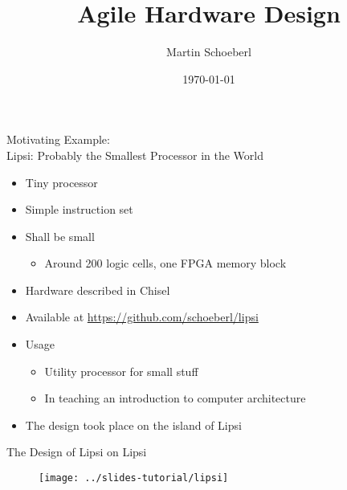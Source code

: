 

\newif\ifbook


\usepackage{tikz}
\usetikzlibrary{positioning, arrows.meta}


\title{Agile Hardware Design}
\author{Martin Schoeberl}
\date{\today}



\begin{frame}
\titlepage
\end{frame}


\begin{frame}[fragile]{Motivating Example:\\
Lipsi: Probably the Smallest Processor in the World}
\begin{itemize}
\item Tiny processor
\item Simple instruction set
\item Shall be small
\begin{itemize}
\item Around 200 logic cells, one FPGA memory block
\end{itemize}
\item Hardware described in Chisel
\item Available at \url{https://github.com/schoeberl/lipsi}
\item Usage
\begin{itemize}
\item Utility processor for small stuff
\item In teaching an introduction to computer architecture
\end{itemize}
\item The design took place on the island of Lipsi
\end{itemize}
\end{frame}

\begin{frame}[fragile]{The Design of Lipsi on Lipsi}
\begin{figure}
    \centering
    \texttt{[image: ../slides-tutorial/lipsi]}
\end{figure}
\end{frame}

